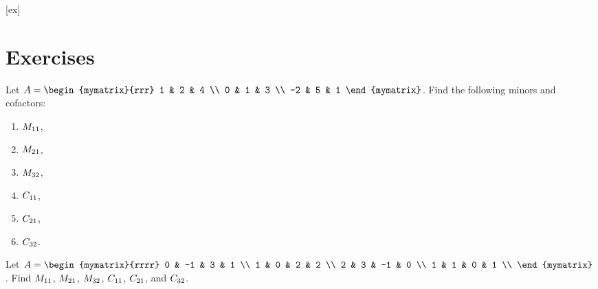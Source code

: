 [ex]
\section*{Exercises}


\begin{ex}
  Let $A = \begin{mymatrix}{rrr}
    1 & 2 & 4 \\
    0 & 1 & 3 \\
    -2 & 5 & 1 
  \end{mymatrix}$. Find the following minors and cofactors:
  \begin{enumerate}
  \item $\minor{A}{11}$,
  \item $\minor{A}{21}$,
  \item $\minor{A}{32}$,
  \item $\cofactor{A}{11}$,
  \item $\cofactor{A}{21}$,
  \item $\cofactor{A}{32}$.
  \end{enumerate}
\end{ex}

\begin{ex}
  Let $A = \begin{mymatrix}{rrrr}
    0 & -1 &  3 & 1 \\
    1 &  0 &  2 & 2 \\
    2 &  3 & -1 & 0 \\
    1 &  1 &  0 & 1 \\
  \end{mymatrix}$. Find $\minor{A}{11}$, $\minor{A}{21}$,
  $\minor{A}{32}$, $\cofactor{A}{11}$, $\cofactor{A}{21}$, and
  $\cofactor{A}{32}$. 
\end{ex}

